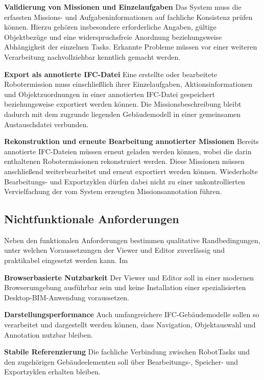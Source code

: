 \textbf{Validierung von Missionen und Einzelaufgaben}\newline
Das System muss die erfassten Missions- und Aufgabeninformationen auf fachliche Konsistenz prüfen
können. Hierzu gehören insbesondere erforderliche Angaben, gültige Objektbezüge und eine
widerspruchsfreie Anordnung beziehungsweise Abhängigkeit der einzelnen Tasks. Erkannte Probleme
müssen vor einer weiteren Verarbeitung nachvollziehbar kenntlich gemacht werden.

\textbf{Export als annotierte IFC-Datei}\newline
Eine erstellte oder bearbeitete Robotermission muss einschließlich ihrer Einzelaufgaben, Aktionsinformationen
und Objektzuordnungen in einer annotierten IFC-Datei gespeichert beziehungsweise exportiert werden
können. Die Missionsbeschreibung bleibt dadurch mit dem zugrunde liegenden Gebäudemodell in einer
gemeinsamen Austauschdatei verbunden.

\textbf{Rekonstruktion und erneute Bearbeitung annotierter Missionen}\newline
Bereits annotierte IFC-Dateien müssen erneut geladen werden können, wobei die darin enthaltenen
Robotermissionen rekonstruiert werden. Diese Missionen müssen anschließend weiterbearbeitet und
erneut exportiert werden können. Wiederholte Bearbeitungs- und Exportzyklen dürfen dabei nicht zu
einer unkontrollierten Vervielfachung der vom System erzeugten Missionsannotation führen. 


\subsection{Nichtfunktionale Anforderungen}

Neben den funktionalen Anforderungen bestimmen qualitative Randbedingungen, unter welchen
Voraussetzungen der Viewer und Editor zuverlässig und praktikabel eingesetzt werden kann. Im

\textbf{Browserbasierte Nutzbarkeit  }\newline
Der Viewer und Editor soll in einer modernen Browserumgebung ausführbar sein und keine Installation
einer spezialisierten Desktop-BIM-Anwendung voraussetzen.

\textbf{Darstellungsperformance  }\newline
Auch umfangreichere IFC-Gebäudemodelle sollen so verarbeitet und dargestellt werden können, dass
Navigation, Objektauswahl und Annotation nutzbar bleiben.

\textbf{Stabile Referenzierung  }\newline
Die fachliche Verbindung zwischen RobotTasks und den zugehörigen Gebäudeelementen soll über
Bearbeitungs-, Speicher- und Exportzyklen erhalten bleiben. 

